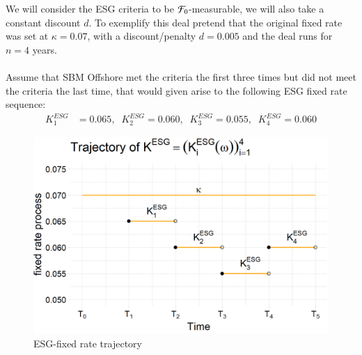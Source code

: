 We will consider the ESG criteria to be $\mathcal{F}_{0}$-measurable, we will also take a constant discount $d$. To exemplify this deal pretend that the original fixed rate was set at $\kappa = 0.07$, with a discount/penalty $d = 0.005$ and the deal runs for $n=4$ years. 
\\~\\
Assume that SBM Offshore met the criteria the first three times but did not meet the criteria the last time, that would given arise to the following ESG fixed rate sequence: 
\begin{align*}
K_{1}^{ESG} &=  0.065, \;\; 
K_{2}^{ESG} =   0.060, \;\;
K_{3}^{ESG} =   0.055, \;\; 
K_{4}^{ESG} =   0.060
\end{align*}


\begin{figure}[htp]
    \centering
    \includegraphics[width=12cm]{figures/ESG/SBM_ESG_path.png}
    \caption{ESG-fixed rate trajectory}
    \label{fig: SBM_ESG_path}
\end{figure}














\newpage 


